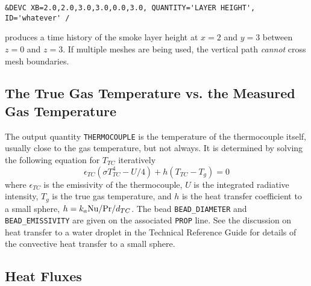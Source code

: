 \documentclass[11pt]{book}
\newcommand{\ct}{\tt\small}
\newcommand{\be}{\begin{equation}}
\newcommand{\ee}{\end{equation}}
\newcommand{\PR}{\hbox{Pr}}
\newcommand{\NU}{\hbox{Nu}}
\begin{document}
\footnotesize
\begin{verbatim}
&DEVC XB=2.0,2.0,3.0,3.0,0.0,3.0, QUANTITY='LAYER HEIGHT', ID='whatever' /
\end{verbatim}
\normalsize

\noindent
produces a time history of the smoke layer height at $x=2$ and $y=3$ between $z=0$ and $z=3$.
If multiple meshes are being used, the vertical path {\em cannot} cross mesh boundaries.



\subsection{The True Gas Temperature vs. the Measured Gas Temperature}
\label{info:THERMOCOUPLE}

The output quantity {\ct THERMOCOUPLE} is the temperature
of the thermocouple itself, usually close to the gas temperature, but not
always. It is determined by solving the following equation
for $T_{TC}$ iteratively~\cite{Welsh:1}
\be \epsilon_{TC} (\sigma T_{TC}^4- U/4) + h(T_{TC}-T_g) = 0 \label{TC}  \ee
where $\epsilon_{TC}$ is the emissivity of the thermocouple, $U$ is the
integrated radiative intensity, $T_g$ is the true gas temperature, and
$h$ is the heat transfer coefficient to a small sphere,
$h=k_a \NU/\PR/d_{TC}$. The bead {\ct BEAD\_DIAMETER} and {\ct BEAD\_EMISSIVITY} are given on the associated {\ct PROP} line.
See the discussion on heat transfer to a water
droplet in the Technical Reference Guide for details of the convective
heat transfer to a small sphere.


\subsection{Heat Fluxes}
\label{info:heat_flux}
\end{document}
